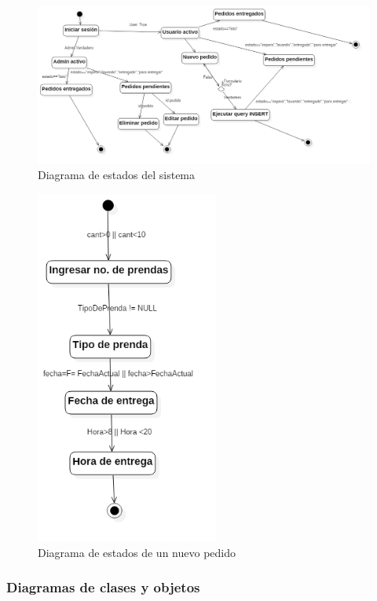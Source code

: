 \begin{figure}[htb]
\begin{center}
\includegraphics[width=18cm]{./imagenes/diagramas/Estado_lavanderia.png}
\end{center}
\caption{Diagrama de estados del sistema}
\end{figure}


\begin{figure}[htb]
\begin{center}
\includegraphics[width=6cm]{./imagenes/diagramas/Estados_lavanderia2.png}
\end{center}
\caption{Diagrama de estados de un nuevo pedido}
\end{figure}


\newpage

\subsubsection{Diagramas de clases y objetos}




